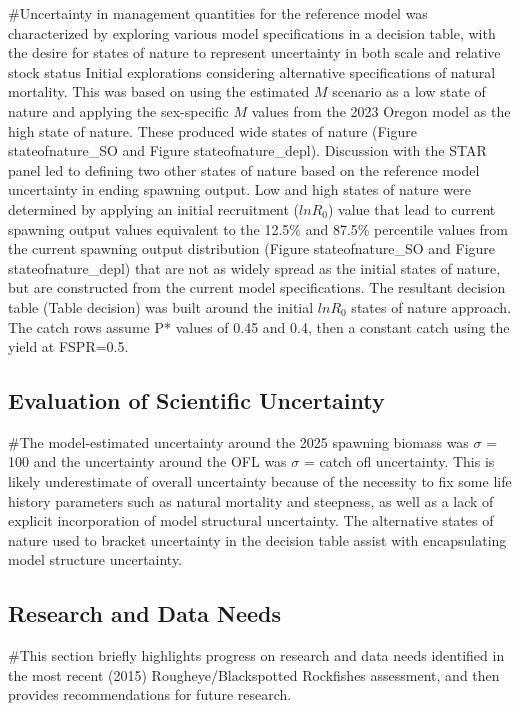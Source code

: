 \documentclass[
]{scrartcl}
\begin{document}
\#Uncertainty in management quantities for the reference model was
characterized by exploring various model specifications in a decision
table, with the desire for states of nature to represent uncertainty in
both scale and relative stock status Initial explorations considering
alternative specifications of natural mortality. This was based on using
the estimated \(M\) scenario as a low state of nature and applying the
sex-specific \(M\) values from the 2023 Oregon model as the high state
of nature. These produced wide states of nature (Figure
stateofnature\_SO and Figure stateofnature\_depl). Discussion with the
STAR panel led to defining two other states of nature based on the
reference model uncertainty in ending spawning output. Low and high
states of nature were determined by applying an initial recruitment
(\(lnR_0\)) value that lead to current spawning output values equivalent
to the 12.5\% and 87.5\% percentile values from the current spawning
output distribution (Figure stateofnature\_SO and Figure
stateofnature\_depl) that are not as widely spread as the initial states
of nature, but are constructed from the current model specifications.
The resultant decision table (Table decision) was built around the
initial \(lnR_0\) states of nature approach. The catch rows assume P*
values of 0.45 and 0.4, then a constant catch using the yield at
FSPR=0.5.

\subsection{Evaluation of Scientific
Uncertainty}\label{evaluation-of-scientific-uncertainty}

\#The model-estimated uncertainty around the 2025 spawning biomass was
\(\sigma\) = 100 and the uncertainty around the OFL was \(\sigma\) =
catch ofl uncertainty. This is likely underestimate of overall
uncertainty because of the necessity to fix some life history parameters
such as natural mortality and steepness, as well as a lack of explicit
incorporation of model structural uncertainty. The alternative states of
nature used to bracket uncertainty in the decision table assist with
encapsulating model structure uncertainty.

\subsection{Research and Data Needs}\label{research-and-data-needs-1}

\#This section briefly highlights progress on research and data needs
identified in the most recent (2015) Rougheye/Blackspotted Rockfishes
assessment, and then provides recommendations for future research.
\end{document}
